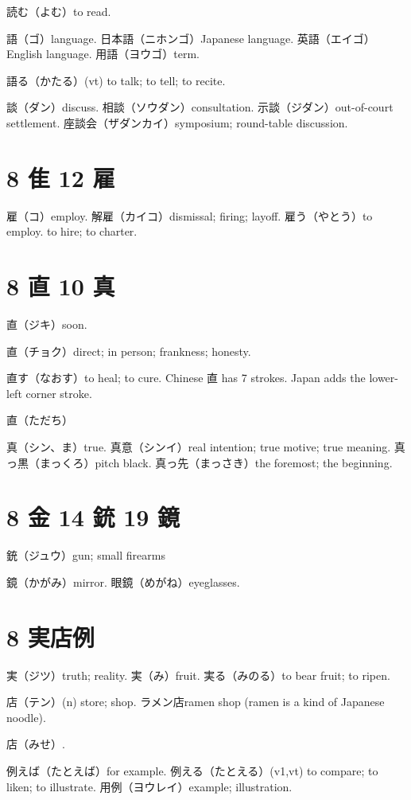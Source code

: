 読む（よむ）to read.

語（ゴ）language.
日本語（ニホンゴ）Japanese language.
英語（エイゴ）English language.
用語（ヨウゴ）term.

語る（かたる）(vt) to talk; to tell; to recite.

談（ダン）discuss.
相談（ソウダン）consultation.
示談（ジダン）out-of-court settlement.
座談会（ザダンカイ）symposium; round-table discussion.

\section{8 隹 12 雇}

雇（コ）employ.
解雇（カイコ）dismissal; firing; layoff.
雇う（やとう）to employ. to hire; to charter.

\section{8 直 10 真}

直（ジキ）soon.

直（チョク）direct; in person; frankness; honesty.

直す（なおす）to heal; to cure.
Chinese 直 has 7 strokes.
Japan adds the lower-left corner stroke.

直（ただち）

真（シン、ま）true.
真意（シンイ）real intention; true motive; true meaning.
真っ黒（まっくろ）pitch black.
真っ先（まっさき）the foremost; the beginning.

\section{8 金 14 銃 19 鏡}

銃（ジュウ）gun; small firearms

鏡（かがみ）mirror.
眼鏡（めがね）eyeglasses.

\section{8 実店例}

実（ジツ）truth; reality.
実（み）fruit.
実る（みのる）to bear fruit; to ripen.

店（テン）(n) store; shop.
ラメン店ramen shop (ramen is a kind of Japanese noodle).

店（みせ）.

例えば（たとえば）for example.
例える（たとえる）(v1,vt)
to compare; to liken; to illustrate.
用例（ヨウレイ）example; illustration.

